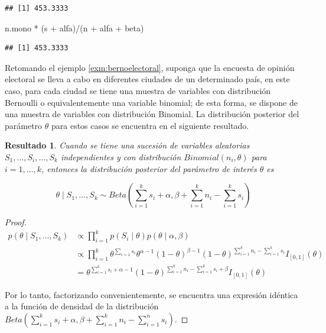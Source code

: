 \documentclass[
  10pt,
  spanish,
]{book}
\newenvironment{Shaded}{\begin{snugshade}}{\end{snugshade}}
\newcommand{\NormalTok}[1]{#1}
\newcommand{\SpecialCharTok}[1]{\textcolor[rgb]{0.00,0.00,0.00}{#1}}
\newtheorem{proposition}{Resultado}[chapter]
\theoremstyle{definition}
\theoremstyle{definition}
\theoremstyle{definition}
\theoremstyle{definition}
\theoremstyle{remark}
\begin{document}
\begin{verbatim}
## [1] 453.3333
\end{verbatim}

\begin{Shaded}
\begin{Highlighting}[]
\NormalTok{n.mono }\SpecialCharTok{*}\NormalTok{ (s }\SpecialCharTok{+}\NormalTok{ alfa)}\SpecialCharTok{/}\NormalTok{(n }\SpecialCharTok{+}\NormalTok{ alfa }\SpecialCharTok{+}\NormalTok{ beta)}
\end{Highlighting}
\end{Shaded}

\begin{verbatim}
## [1] 453.3333
\end{verbatim}

Retomando el ejemplo \ref{exm:bernoelectoral}, suponga que la encuesta de opinión electoral
se lleva a cabo en diferentes ciudades de un determinado país, en este
caso, para cada ciudad se tiene una muestra de variables con
distribución Bernoulli o equivalentemente una variable binomial; de esta
forma, se dispone de una muestra de variables con distribución Binomial.
La distribución posterior del parámetro \(\theta\) para estos casos se
encuentra en el siguiente resultado.

\begin{proposition}
\protect\hypertarget{prp:postbinom}{}{\label{prp:postbinom} }Cuando se tiene una sucesión de variables aleatorias \(S_1,\ldots,S_i, \ldots,S_k\) independientes y con distribución \(Binomial(n_i,\theta)\) para \(i=1,\ldots,k\), entonces la distribución posterior del parámetro de interés \(\theta\) es

\begin{equation*}
\theta \mid S_1,\ldots,S_k \sim Beta\left(\sum_{i=1}^ks_i+\alpha,\beta+\sum_{i=1}^k n_i-\sum_{i=1}^k s_i\right)
\end{equation*}
\end{proposition}

\begin{proof}
{}\begin{align*}
p(\theta \mid S_1,\ldots,S_k)&\propto \prod_{i=1}^kp(S_i \mid \theta)p(\theta \mid \alpha,\beta)\\
&\propto \prod_{i=1}^k\theta^{\sum_{i=1}s_i}\theta^{\alpha-1}(1-\theta)^{\beta-1}
(1-\theta)^{\sum_{i=1}^kn_i-\sum_{i=1}^ks_i}I_{[0,1]}(\theta)\\
&= \theta^{\sum_{i=1}^ks_i+\alpha-1}(1-\theta)^{\sum_{i=1}^kn_i-\sum_{i=1}^ks_i+\beta}I_{[0,1]}(\theta)
\end{align*}

Por lo tanto, factorizando convenientemente, se encuentra una expresión idéntica a la función de densidad de la distribución \(Beta\left(\sum_{i=1}^ks_i+\alpha,\beta+\sum_{i=1}^k n_i-\sum_{i=1}^n s_i\right)\).
\end{proof}
\end{document}
